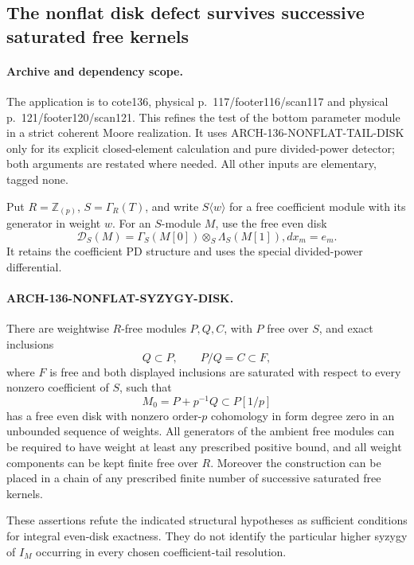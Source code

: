 \subsection{The nonflat disk defect survives successive saturated free kernels}
\label{arch136:nonflat-syzygy}

\paragraph{Archive and dependency scope.}
The application is to cote136, physical p.~117/footer116/scan117
and physical p.~121/footer120/scan121. This refines the test of
the bottom parameter module in a strict coherent Moore
realization. It uses ARCH-136-NONFLAT-TAIL-DISK only for its
explicit closed-element calculation and pure divided-power
detector; both arguments are restated where needed. All other
inputs are elementary, tagged none.

Put \(R=\mathbb Z_{(p)}\), \(S=\Gamma_R(T)\), and write
\(S\langle w\rangle\) for a free coefficient module with its
generator in weight \(w\). For an \(S\)-module \(M\), use
the free even disk
\[
       \mathscr D_S(M)=\Gamma_S(M[0])\otimes_S\Lambda_S(M[1]),
                         d x_m=e_m .                    \tag{NS.1}
\]
It retains the coefficient PD structure and uses the special
divided-power differential.

\paragraph{ARCH-136-NONFLAT-SYZYGY-DISK.}
There are weightwise \(R\)-free modules \(P,Q,C\), with
\(P\) free over \(S\), and exact inclusions
\[
            Q\subset P,\qquad P/Q=C\subset F,
                                                               \tag{NS.2}
\]
where \(F\) is free and both displayed inclusions are
saturated with respect to every nonzero coefficient of \(S\),
such that
\[
                         M_0=P+p^{-1}Q\subset P[1/p]
                                                               \tag{NS.3}
\]
has a free even disk with nonzero order-\(p\) cohomology in
form degree zero in an unbounded sequence of weights.
All generators of the ambient free modules can be required
to have weight at least any prescribed positive bound, and
all weight components can be kept finite free over \(R\).
Moreover the construction can be placed in a chain of any
prescribed finite number of successive saturated free kernels.

These assertions refute the indicated structural hypotheses
as sufficient conditions for integral even-disk exactness.
They do not identify the particular higher syzygy of \(I_M\)
occurring in every chosen coefficient-tail resolution.

